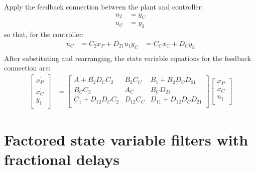 \documentclass[a4paper,twoside,10pt,english]{report}
\begin{document}
Apply the feedback connection between the plant and controller:
\begin{align*}
u_{2}&=y_{C} \\
u_{C}&=y_{2}
\end{align*}
so that, for the controller:
\begin{align*}
u_{C}&= C_{2}x_{P} + D_{21}u_{1}
y_{C}&= C_{C}x_{C} + D_{C}y_{2} \\
\end{align*}
After substituting and rearranging, the state variable equations for the
feedback connection are:
\begin{align*}
\left[ \begin{array}{c}
x^{\prime}_{P} \\ 
x^{\prime}_{C} \\ 
y_{1} \\
\end{array}\right]
 &= 
\left[ \begin{array}{ccc}
A+B_{2}D_{C}C_{2}     & B_{2}C_{C} & B_{1}+B_{2}D_{C}D_{21}\\ 
B_{C}C_{2}           & A_{C}      & B_{C}D_{21}\\
C_{1}+D_{12}D_{C}C_{2} & D_{12}C_{C} & D_{11}+D_{12}D_{C}D_{21} \\
\end{array}\right]
\left[ \begin{array}{c}
x_{P} \\ 
x_{C}\\
u_{1} \\
\end{array}\right]
\end{align*}

\section{\label{sec:Factored-state-variable-filters-with-fractional-delays}Factored state variable filters with fractional delays}
\end{document}
